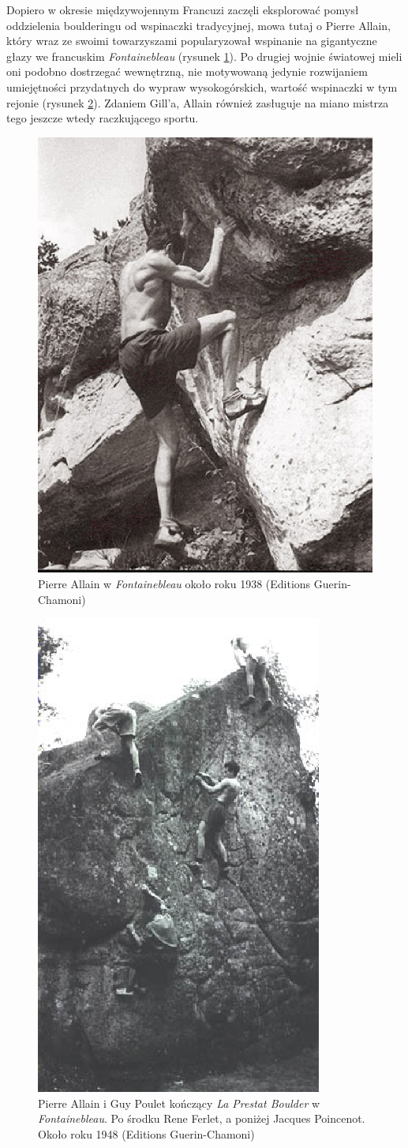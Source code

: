 \documentclass{article}
\begin{document}
Dopiero w okresie międzywojennym Francuzi zaczęli eksplorować pomysł oddzielenia boulderingu od wspinaczki tradycyjnej, mowa tutaj o Pierre Allain, który wraz ze swoimi towarzyszami popularyzował wspinanie na gigantyczne głazy we francuskim \textit{Fontainebleau} (rysunek \ref{allain-1}). Po drugiej wojnie światowej mieli oni podobno dostrzegać wewnętrzną, nie motywowaną jedynie rozwijaniem umiejętności przydatnych do wypraw wysokogórskich, wartość wspinaczki w tym rejonie (rysunek \ref{allain-2}). Zdaniem Gill'a, Allain również zasługuje na miano mistrza tego jeszcze wtedy raczkującego sportu.

\begin{figure}[!htbp]
	\begin{center}
		\includegraphics[width=0.5\linewidth]{images/allain-1.eps}
	\end{center}
	\caption{Pierre Allain w \textit{Fontainebleau} około roku 1938 (Editions Guerin-Chamoni) \cite{gill-history2}}
	\label{allain-1}
\end{figure}

\begin{figure}[!htbp]
	\begin{center}
		\includegraphics[width=0.35\linewidth]{images/allain-2.eps}
	\end{center}
	\caption{Pierre Allain i Guy Poulet kończący \textit{La Prestat Boulder} w \textit{Fontainebleau}. Po środku Rene Ferlet, a poniżej Jacques Poincenot. Około roku 1948 (Editions Guerin-Chamoni) \cite{gill-history2}}
	\label{allain-2}
\end{figure}
\end{document}
